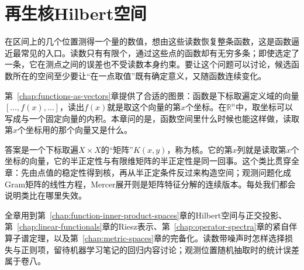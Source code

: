 \chapter{再生核Hilbert空间}
\label{chap:rkhs}

在区间上的几个位置测得一个量的数值，想由这些读数恢复整条函数，这是函数逼近最常见的入口。读数只有有限个，通过这些点的函数却有无穷多条；即使选定了一条，它在测点之间的误差也不受读数本身约束。要让这个问题可以讨论，候选函数所在的空间至少要让“在一点取值”既有确定意义，又随函数连续变化。

第~\ref{chap:functions-as-vectors}章提供了合适的图景：函数是下标取遍定义域的向量$[\ldots,f(x),\ldots]$，读出$f(x)$就是取这个向量的第$x$个坐标。在$\mathbb R^n$中，取坐标可以写成与一个固定向量的内积。本章问的是，函数空间里什么时候也能这样做，读取第$x$个坐标用的那个向量又是什么。

答案是一个下标取遍$X\times X$的“矩阵”$K(x,y)$，称为核。它的第$x$列就是读取第$x$个坐标的向量，它的半正定性与有限维矩阵的半正定性是同一回事。这个类比贯穿全章：先由点值的稳定性得到核，再从半正定条件反过来构造空间；观测问题化成Gram矩阵的线性方程，Mercer展开则是矩阵特征分解的连续版本。每处我们都会说明类比在哪里失效。

全章用到第~\ref{chap:function-inner-product-spaces}章的Hilbert空间与正交投影、第~\ref{chap:linear-functionals}章的Riesz表示、第~\ref{chap:operator-spectra}章的紧自伴算子谱定理，以及第~\ref{chap:metric-spaces}章的完备化。读数带噪声时怎样选择损失与正则项，留待机器学习笔记的回归内容讨论；观测位置随机抽取时的统计误差属于卷八。









